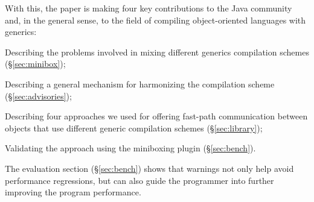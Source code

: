 With this, the paper is making four key contributions to the Java community and, in the general sense, to the field of compiling object-oriented languages with generics:

\begin{compactitem}
  \item Describing the problems involved in mixing different generics compilation schemes (\S\ref{sec:minibox});
  \item Describing a general mechanism for harmonizing the compilation scheme (\S\ref{sec:advisories});
  \item Describing four approaches we used for offering fast-path communication between objects that use different generic compilation schemes (\S\ref{sec:library});
  \item Validating the approach using the miniboxing plugin (\S\ref{sec:bench}).
\end{compactitem}

The evaluation section (\S\ref{sec:bench}) shows that warnings not only help avoid performance regressions, but can also guide the programmer into further improving the program performance.